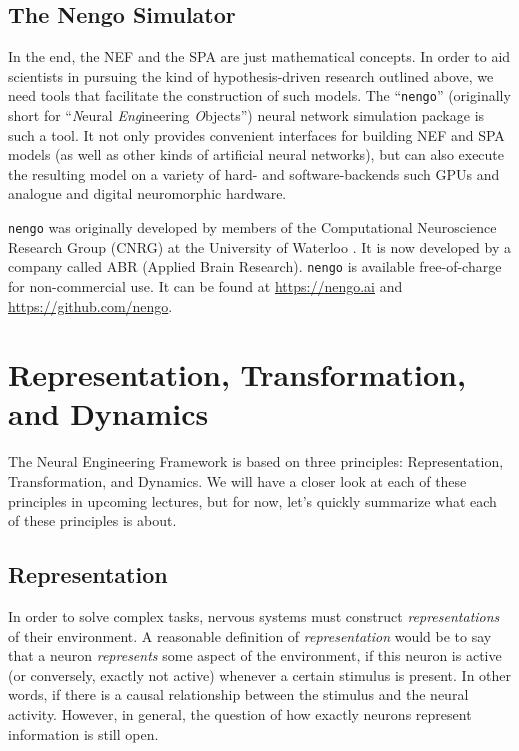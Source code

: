 \documentclass[10pt,letterpaper,oneside]{article}
\begin{document}
\subsection{The Nengo Simulator}
In the end, the NEF and the SPA are just mathematical concepts. In order to aid scientists in pursuing the kind of hypothesis-driven research outlined above, we need tools that facilitate the construction of such models. The \enquote{\texttt{nengo}} (originally short for \enquote{\emph{N}eural \emph{Eng}ineering \emph{O}bjects}) neural network simulation package is such a tool. It not only provides convenient interfaces for building NEF and SPA models (as well as other kinds of artificial neural networks), but can also execute the resulting model on a variety of hard- and software-backends such GPUs and analogue and digital neuromorphic hardware.

\texttt{nengo} was originally developed by members of the Computational Neuroscience Research Group (CNRG) at the University of Waterloo \cite{bekolay2014nengo}. It is now developed by a company called ABR (Applied Brain Research). \texttt{nengo} is available free-of-charge for non-commercial use. It can be found at \url{https://nengo.ai} and \url{https://github.com/nengo}.


\section{Representation, Transformation, and Dynamics}

The Neural Engineering Framework is based on three principles: Representation, Transformation, and Dynamics. We will have a closer look at each of these principles in upcoming lectures, but for now, let's quickly summarize what each of these principles is about.

\subsection{Representation}

In order to solve complex tasks, nervous systems must construct \emph{representations} of their environment. A reasonable definition of \emph{representation} would be to say that a neuron \emph{represents} some aspect of the environment, if this neuron is active (or conversely, exactly not active) whenever a certain stimulus is present. In other words, if there is a causal relationship between the stimulus and the neural activity. However, in general, the question of how exactly neurons represent information is still open.
\end{document}
